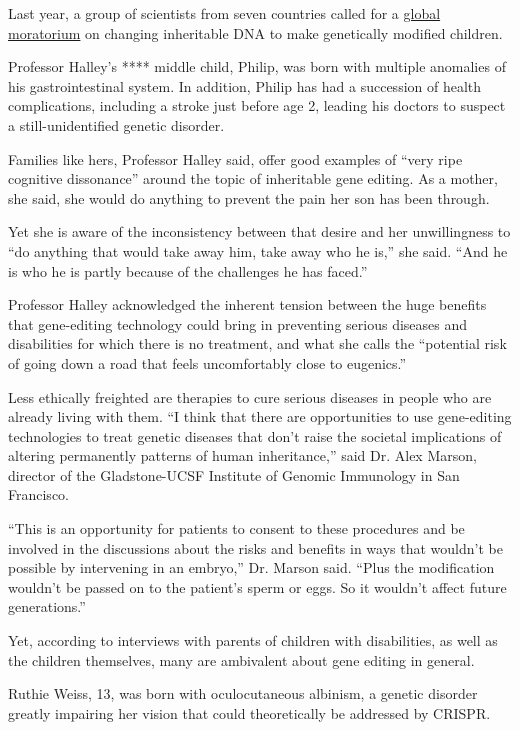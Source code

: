 Last year, a group of scientists from seven countries called for a
\href{https://www.nature.com/articles/d41586-019-00726-5}{global
moratorium} on changing inheritable DNA to make genetically modified
children.

Professor Halley's **** middle child, Philip, was born with multiple
anomalies of his gastrointestinal system. In addition, Philip has had a
succession of health complications, including a stroke just before age
2, leading his doctors to suspect a still-unidentified genetic disorder.

Families like hers, Professor Halley said, offer good examples of ``very
ripe cognitive dissonance'' around the topic of inheritable gene
editing. As a mother, she said, she would do anything to prevent the
pain her son has been through.

Yet she is aware of the inconsistency between that desire and her
unwillingness to ``do anything that would take away him, take away who
he is,'' she said. ``And he is who he is partly because of the
challenges he has faced.''

Professor Halley acknowledged the inherent tension between the huge
benefits that gene-editing technology could bring in preventing serious
diseases and disabilities for which there is no treatment, and what she
calls the ``potential risk of going down a road that feels uncomfortably
close to eugenics.''

Less ethically freighted are therapies to cure serious diseases in
people who are already living with them. ``I think that there are
opportunities to use gene-editing technologies to treat genetic diseases
that don't raise the societal implications of altering permanently
patterns of human inheritance,'' said Dr. Alex Marson, director of the
Gladstone-UCSF Institute of Genomic Immunology in San Francisco.

``This is an opportunity for patients to consent to these procedures and
be involved in the discussions about the risks and benefits in ways that
wouldn't be possible by intervening in an embryo,'' Dr. Marson said.
``Plus the modification wouldn't be passed on to the patient's sperm or
eggs. So it wouldn't affect future generations.''

Yet, according to interviews with parents of children with disabilities,
as well as the children themselves, many are ambivalent about gene
editing in general.

Ruthie Weiss, 13, was born with oculocutaneous albinism, a genetic
disorder greatly impairing her vision that could theoretically be
addressed by CRISPR.

